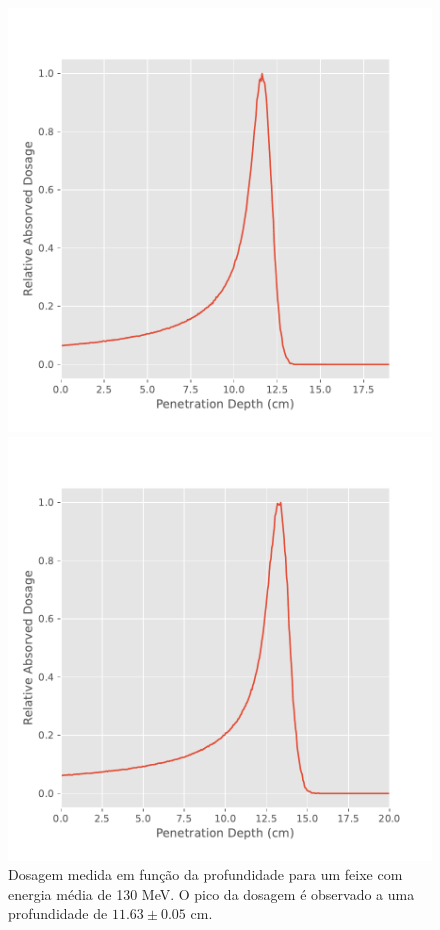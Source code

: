 \documentclass[a4paper, 12pt]{article} %
\begin{document}
	\begin{figure}[H]
		\begin{minipage}[r]{.49\linewidth}
			\centering
			\includegraphics[width=\linewidth]{bragg_peak_130mev.pdf}
			\caption{Dosagem medida em função da profundidade para um feixe com energia média de 130 MeV. O pico da dosagem é observado a uma profundidade de $11.63  \pm 0.05$ cm.}
			\label{fig:bragg_peak130}
		\end{minipage}
		\hspace{.01\linewidth}
		\begin{minipage}[r]{.49\linewidth}
			\centering
			\includegraphics[width=\linewidth]{bragg_peak_140mev.pdf}

\end{minipage}
\end{figure}
\end{document}
